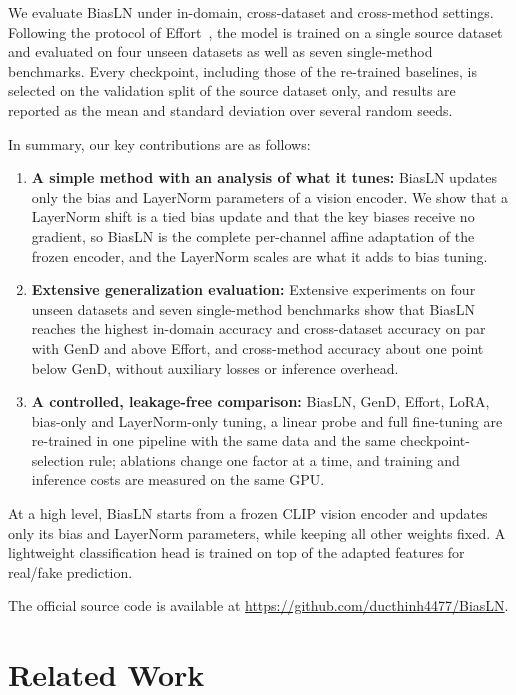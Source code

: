 \documentclass[fonts]{icst}
\newif\ifrevmark\revmarktrue
\newcommand{\rev}[1]{\ifrevmark{\color{revblue}#1}\else#1\fi}
\begin{document}
We evaluate BiasLN under in-domain, cross-dataset and cross-method settings. Following the protocol of Effort~\cite{yan2025effort}, the model is trained on a single source dataset \rev{and evaluated on four unseen datasets as well as seven single-method benchmarks. Every checkpoint, including those of the re-trained baselines, is selected on the validation split of the source dataset only, and results are reported as the mean and standard deviation over several random seeds.}

In summary, our key contributions are as follows:
\begin{enumerate}
    \item \textbf{A simple \rev{method with an analysis of what it tunes}:} BiasLN updates only the bias and LayerNorm parameters of a vision encoder. \rev{We show that a LayerNorm shift is a tied bias update and that the key biases receive no gradient, so BiasLN is the complete per-channel affine adaptation of the frozen encoder, and the LayerNorm scales are what it adds to bias tuning.}

    \item \textbf{Extensive generalization evaluation:} Extensive experiments on \rev{four} unseen datasets and seven single-method benchmarks \rev{show that BiasLN reaches the highest in-domain accuracy and cross-dataset accuracy on par with GenD and above Effort, and cross-method accuracy about one point below GenD, without auxiliary losses or inference overhead.}

    \item \rev{\textbf{A controlled, leakage-free comparison:} BiasLN, GenD, Effort, LoRA, bias-only and LayerNorm-only tuning, a linear probe and full fine-tuning are re-trained in one pipeline with the same data and the same checkpoint-selection rule; ablations change one factor at a time, and training and inference costs are measured on the same GPU.}
\end{enumerate}
At a high level, BiasLN starts from a frozen CLIP vision encoder and updates only its bias and LayerNorm parameters, while keeping all other weights fixed.
A lightweight classification head is trained on top of the adapted features for real/fake prediction.

The official source code \rev{is available} at \href{https://github.com/ducthinh4477/BiasLN}{\rev{https://github.com/ducthinh4477/BiasLN}}.

\section{Related Work}
\end{document}
